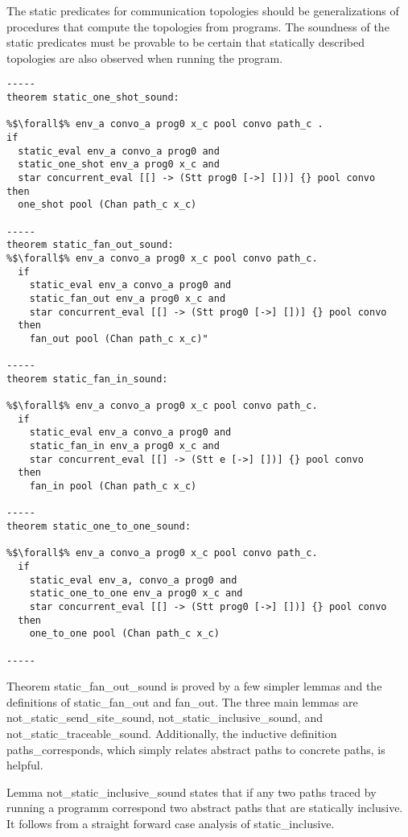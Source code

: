 \documentclass{article}
\begin{document}
The static predicates for communication topologies should be generalizations of procedures that
compute the topologies from programs. The soundness of the static predicates must be provable
to be certain that statically described topologies are also observed when running the program.

\begin{lstlisting}[language=logic, escapechar=\%]
-----
theorem static_one_shot_sound: 

%$\forall$% env_a convo_a prog0 x_c pool convo path_c .
if
  static_eval env_a convo_a prog0 and 
  static_one_shot env_a prog0 x_c and 
  star concurrent_eval [[] -> (Stt prog0 [->] [])] {} pool convo
then
  one_shot pool (Chan path_c x_c)

-----
theorem static_fan_out_sound:
%$\forall$% env_a convo_a prog0 x_c pool convo path_c. 
  if 
    static_eval env_a convo_a prog0 and 
    static_fan_out env_a prog0 x_c and 
    star concurrent_eval [[] -> (Stt prog0 [->] [])] {} pool convo
  then
    fan_out pool (Chan path_c x_c)" 

-----
theorem static_fan_in_sound:

%$\forall$% env_a convo_a prog0 x_c pool convo path_c. 
  if
    static_eval env_a convo_a prog0 and 
    static_fan_in env_a prog0 x_c and 
    star concurrent_eval [[] -> (Stt e [->] [])] {} pool convo
  then
    fan_in pool (Chan path_c x_c)

-----
theorem static_one_to_one_sound:

%$\forall$% env_a convo_a prog0 x_c pool convo path_c. 
  if
    static_eval env_a, convo_a prog0 and 
    static_one_to_one env_a prog0 x_c and
    star concurrent_eval [[] -> (Stt prog0 [->] [])] {} pool convo
  then
    one_to_one pool (Chan path_c x_c)

-----

\end{lstlisting}

Theorem static\_fan\_out\_sound is proved by a few simpler lemmas and the definitions
of static\_fan\_out and fan\_out.  The three main lemmas are not\_static\_send\_site\_sound,
not\_static\_inclusive\_sound, and not\_static\_traceable\_sound.  Additionally, the inductive
definition paths\_corresponds, which simply relates abstract paths to concrete paths,
is helpful. 

Lemma not\_static\_inclusive\_sound states that if any two paths traced by running a programm
correspond two abstract paths that are statically inclusive.  It follows from a straight
forward case analysis of static\_inclusive.
\end{document}
